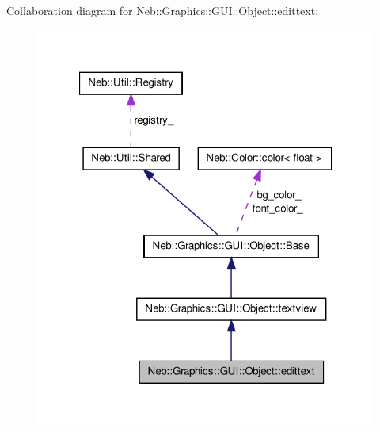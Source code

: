 \-Collaboration diagram for \-Neb\-:\-:\-Graphics\-:\-:\-G\-U\-I\-:\-:\-Object\-:\-:edittext\-:\nopagebreak
\begin{figure}[H]
\begin{center}
\leavevmode
\includegraphics[width=321pt]{classNeb_1_1Graphics_1_1GUI_1_1Object_1_1edittext__coll__graph}
\end{center}
\end{figure}
